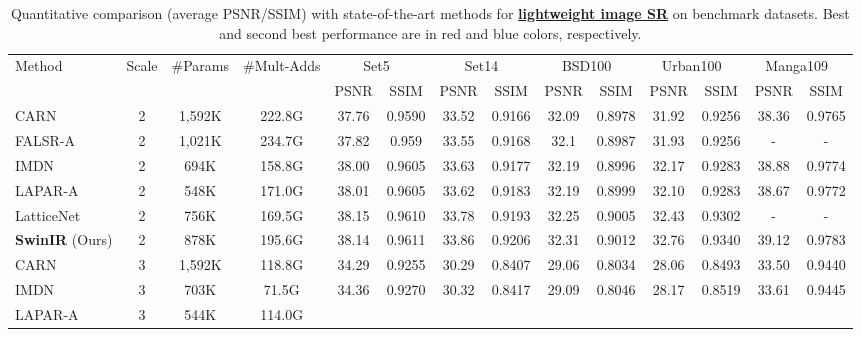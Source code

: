 \documentclass[10pt,twocolumn,letterpaper]{article}
\newcommand{\R}[1]{\textcolor[rgb]{1.00,0.00,0.00}{#1}}
\newcommand{\B}[1]{\textcolor[rgb]{0.00,0.00,1.00}{#1}}
\newcommand{\algname}{SwinIR}
\newlength \g
\begin{document}
\begin{table*}[!t]\scriptsize
\center
\begin{center}
\caption{Quantitative comparison (average PSNR/SSIM) with state-of-the-art methods for \textbf{\underline{lightweight image SR}} on benchmark datasets. Best and second best performance are in \R{red} and \B{blue} colors, respectively.}
\vspace{-2mm}
\label{tab:lightweight_sr_results}
\begin{tabular}{|l|c|c|c|c|c|c|c|c|c|c|c|c|c|}
\hline
\multirow{2}{*}{Method} & \multirow{2}{*}{Scale} & \multirow{2}{*}{\#Params} & \multirow{2}{*}{\#Mult-Adds} &  \multicolumn{2}{c|}{Set5~\cite{Set5}} &  \multicolumn{2}{c|}{Set14~\cite{Set14}} &  \multicolumn{2}{c|}{BSD100~\cite{BSD100}} &  \multicolumn{2}{c|}{Urban100~\cite{Urban100}} &  \multicolumn{2}{c|}{Manga109~\cite{Manga109}}  
\\
\cline{5-14}
&  &  &  & PSNR & SSIM & PSNR & SSIM & PSNR & SSIM & PSNR & SSIM & PSNR & SSIM 
\\
\hline
\hline
CARN~\cite{ahn2018CARN} & 2  & 1,592K & 222.8G
& 37.76
& 0.9590
& 33.52
& 0.9166
& 32.09
& 0.8978
& 31.92
& 0.9256
& 38.36
& 0.9765
\\
FALSR-A~\cite{chu2021fast} & 2  & 1,021K & 234.7G
& 37.82
& 0.959
& 33.55
& 0.9168
& 32.1
& 0.8987 
& 31.93 
& 0.9256
& -
& -
\\
IMDN~\cite{hui2019imdn} & 2  & 694K & 158.8G
& 38.00
& 0.9605
& 33.63
& 0.9177
& 32.19
& 0.8996
& 32.17
& 0.9283
& \B{38.88}
& \B{0.9774}
\\
LAPAR-A~\cite{li2021lapar} & 2  & 548K & 171.0G
& 38.01
& 0.9605
& 33.62
& 0.9183
& 32.19
& 0.8999
& 32.10
& 0.9283
& 38.67
& 0.9772
\\
LatticeNet~\cite{luo2020latticenet} & 2  & 756K & 169.5G
& \R{38.15}
& \B{0.9610}
& \B{33.78}
& \B{0.9193}
& \B{32.25}
& \B{0.9005}
& \B{32.43}
& \B{0.9302}
& -
& -
\\
\textbf{\algname{}} (Ours)\qquad\qquad  & 2  & 878K & {195.6G} & \B{38.14}
& \R{0.9611}
& \R{33.86}
& \R{0.9206}
& \R{32.31}
& \R{0.9012}
& \R{32.76}
& \R{0.9340}
& \R{39.12}
& \R{0.9783}
\\
\hline   
CARN~\cite{ahn2018CARN} & 3  & 1,592K  & 118.8G
& 34.29
& 0.9255
& 30.29
& 0.8407
& 29.06
& 0.8034
& 28.06
& 0.8493
& 33.50 
& 0.9440
\\ 
IMDN~\cite{hui2019imdn} & 3  & 703K  & 71.5G 
& 34.36
& 0.9270
& 30.32
& 0.8417
& 29.09
& 0.8046
& 28.17
& 0.8519
& \B{33.61}
& \B{0.9445}
\\ 
LAPAR-A~\cite{li2021lapar} & 3  & 544K & 114.0G

\end{tabular}
\end{center}
\end{table*}
\end{document}
